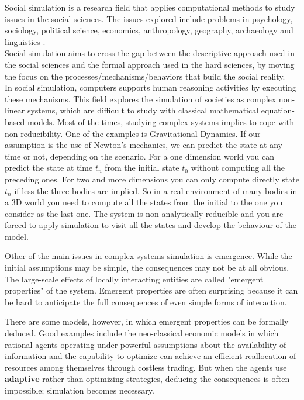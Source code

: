\documentclass{report}
\begin{document}
Social simulation is a research field that applies computational methods to study issues in the social sciences. The issues explored include problems in psychology, sociology, political science, economics, anthropology, geography, archaeology and linguistics \cite{TakahashiSallachRouchier2007}.\\
Social simulation aims to cross the gap between the descriptive approach used in the social sciences and the formal approach used in the hard sciences, by moving the focus on the processes/mechanisms/behaviors that build the social reality.\\
In social simulation, computers supports human reasoning activities by executing these mechanisms. This field explores the simulation of societies as complex non-linear systems, which are difficult to study with classical mathematical equation-based models.
Most of the times, studying complex systems implies to cope with non reducibility. One of the examples is Gravitational Dynamics. If our assumption is the use of Newton's mechanics, we can predict the state at any time or not, depending on the scenario. For a one dimension world you can predict the state at time $t_n$ from the initial state $t_0$ without computing all the preceding ones. For two and more dimensions you can only compute directly state $t_n$ if less the three bodies are implied. So in a real environment of many bodies in a 3D world you need to compute all the states from the initial to the one you consider as the last one. The system is non analytically reducible and you are forced to apply simulation to visit all the states and develop the behaviour of the model.

Other of the main issues in complex systems simulation is emergence. While the initial assumptions may be simple, the consequences may not be at all obvious. The large-scale effects of locally interacting entities are called "emergent properties" of the system. Emergent properties are often surprising because it can be hard to anticipate the full consequences of even simple forms of interaction. 

There are some models, however, in which emergent properties can be formally deduced. Good examples include the neo-classical economic models in which rational agents operating under powerful assumptions about the availability of information and the capability to optimize can achieve an efficient reallocation of resources among themselves through costless trading. But when the agents use \textbf{adaptive} rather than optimizing strategies, deducing the consequences is often impossible; simulation becomes necessary.
\end{document}
